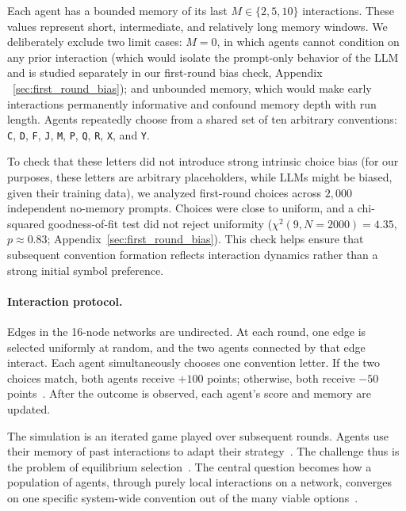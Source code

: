 \documentclass{article}
\begin{document}
Each agent has a bounded memory of its last $M \in \{2,5,10\}$ interactions. These values represent short, intermediate, and relatively long memory windows. We deliberately exclude two limit cases: $M=0$, in which agents cannot condition on any prior interaction (which would isolate the prompt-only behavior of the LLM and is studied separately in our first-round bias check, Appendix ~\ref{sec:first_round_bias}); and unbounded memory, which would make early interactions permanently informative and confound memory depth with run length. Agents repeatedly choose from a shared set of ten arbitrary conventions: \texttt{C}, \texttt{D}, \texttt{F}, \texttt{J}, \texttt{M}, \texttt{P}, \texttt{Q}, \texttt{R}, \texttt{X}, and \texttt{Y}.

To check that these letters did not introduce strong intrinsic choice bias (for our purposes, these letters are arbitrary placeholders, while LLMs might be biased, given their training data), we analyzed first-round choices across $2{,}000$ independent no-memory prompts. Choices were close to uniform, and a chi-squared goodness-of-fit test did not reject uniformity ($\chi^2(9, N=2000)=4.35$, $p \approx 0.83$; Appendix~\ref{sec:first_round_bias}). This check helps ensure that subsequent convention formation reflects interaction dynamics rather than a strong initial symbol preference.

\paragraph{Interaction protocol.}
Edges in the 16-node networks are undirected. At each round, one edge is selected uniformly at random, and the two agents connected by that edge interact. Each agent simultaneously chooses one convention letter. If the two choices match, both agents receive $+100$ points; otherwise, both receive $-50$ points~\cite{schelling1960strategy,harsanyi1988equilibrium}. After the outcome is observed, each agent's score and memory are updated.

The simulation is an iterated game played over subsequent rounds. Agents use their memory of past interactions to adapt their strategy~\cite{fudenberg1998theory,macy1991learning}. The challenge thus is the problem of equilibrium selection~\cite{young1993evolution,kandori1993learning}. The central question becomes how a population of agents, through purely local interactions on a network, converges on one specific system-wide convention out of the many viable options~\cite{lewis1969convention,sugden1986economics,morris2000contagion,jackson2015games}.
\end{document}
